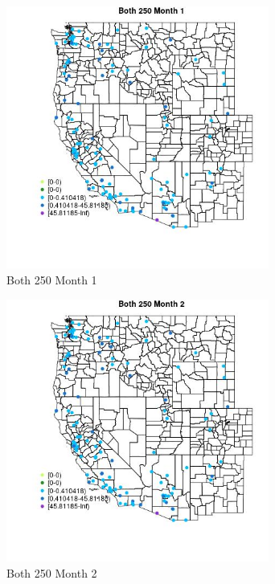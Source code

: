 \begin{figure} 
\centering  
\includegraphics[width=0.77\textwidth]{Code_Outputs/Report_ML_input_PM25_Step4_part_e_de_duplicated_aves_MapObsMo1Both_250.jpg} 
\caption{\label{fig:Report_ML_input_PM25_Step4_part_e_de_duplicated_avesMapObsMo1Both_250}Both 250 Month 1} 
\end{figure} 
 

\begin{figure} 
\centering  
\includegraphics[width=0.77\textwidth]{Code_Outputs/Report_ML_input_PM25_Step4_part_e_de_duplicated_aves_MapObsMo2Both_250.jpg} 
\caption{\label{fig:Report_ML_input_PM25_Step4_part_e_de_duplicated_avesMapObsMo2Both_250}Both 250 Month 2} 
\end{figure} 
 

